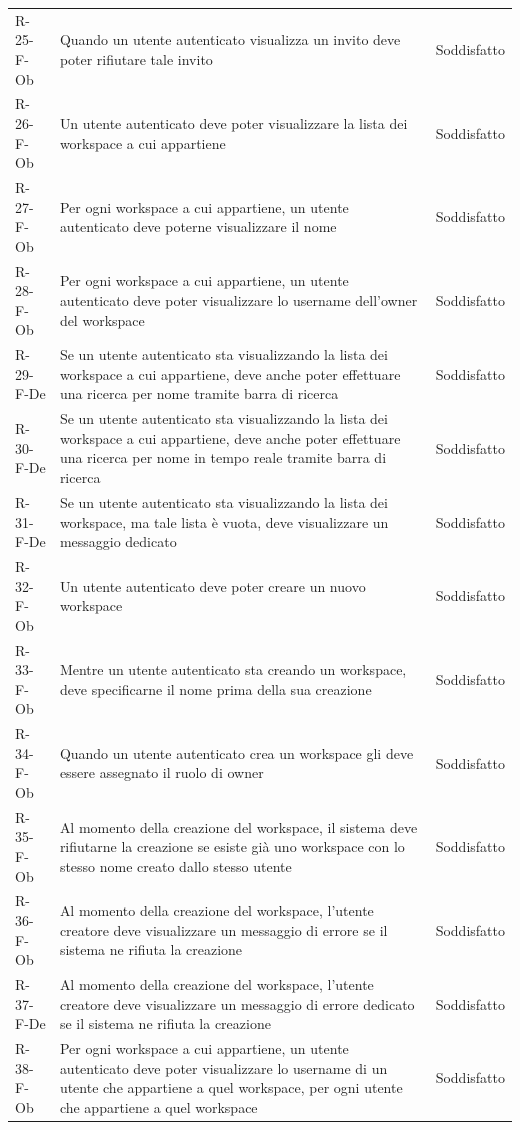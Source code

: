\documentclass[a4paper, 11pt]{article}
\begin{document}
\begin{longtable}[c]{ >{\centering\arraybackslash}m{2.5cm} >{\centering\arraybackslash}m{8.3cm} >{\centering\arraybackslash}m{3.5cm} }
R-25-F-Ob & Quando un utente autenticato visualizza un invito deve poter rifiutare tale invito & Soddisfatto\\
R-26-F-Ob & Un utente autenticato deve poter visualizzare la lista dei workspace a cui appartiene & Soddisfatto\\
R-27-F-Ob & Per ogni workspace a cui appartiene, un utente autenticato deve poterne visualizzare il nome & Soddisfatto\\
R-28-F-Ob & Per ogni workspace a cui appartiene, un utente autenticato deve poter visualizzare lo username dell'owner del workspace & Soddisfatto\\
R-29-F-De & Se un utente autenticato sta visualizzando la lista dei workspace a cui appartiene, deve anche poter effettuare una ricerca per nome tramite barra di ricerca & Soddisfatto\\
R-30-F-De & Se un utente autenticato sta visualizzando la lista dei workspace a cui appartiene, deve anche poter effettuare una ricerca per nome in tempo reale tramite barra di ricerca & Soddisfatto\\
R-31-F-De & Se un utente autenticato  sta visualizzando la lista dei workspace, ma tale lista è vuota, deve visualizzare un messaggio dedicato & Soddisfatto\\
R-32-F-Ob & Un utente autenticato deve poter creare un nuovo workspace & Soddisfatto\\
R-33-F-Ob & Mentre un utente autenticato sta creando un workspace, deve specificarne il nome prima della sua creazione & Soddisfatto\\
R-34-F-Ob & Quando un utente autenticato crea un workspace gli deve essere assegnato il ruolo di owner & Soddisfatto\\
R-35-F-Ob & Al momento della creazione del workspace, il sistema deve rifiutarne la creazione se esiste già uno workspace con lo stesso nome creato dallo stesso utente & Soddisfatto\\
R-36-F-Ob & Al momento della creazione del workspace, l'utente creatore deve visualizzare un messaggio di errore se il sistema ne rifiuta la creazione & Soddisfatto\\
R-37-F-De & Al momento della creazione del workspace, l'utente creatore deve visualizzare un messaggio di errore dedicato se il sistema ne rifiuta la creazione & Soddisfatto\\
R-38-F-Ob & Per ogni workspace a cui appartiene, un utente autenticato deve poter visualizzare lo username di un utente che appartiene a quel workspace, per ogni utente che appartiene a quel workspace & Soddisfatto\\

\end{longtable}
\end{document}

